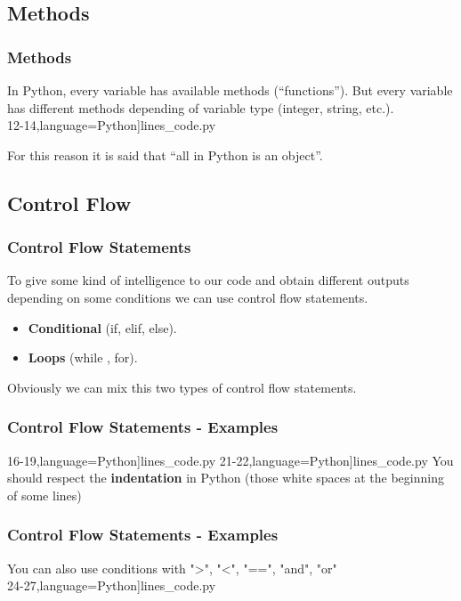 \subsection{Methods}
\begin{frame}
\frametitle{Methods}

{\normalsize In Python, every variable has available methods (“functions”). But every variable has different methods depending of variable type (integer, string, etc.). \\}
\vspace{1em}
{12-14},language=Python]{lines_code.py}

{\normalsize For this reason it is said that “all in Python is an object”.\\}

\end{frame}

\subsection{Control Flow}
\begin{frame}
\frametitle{Control Flow Statements}

{\normalsize To give some kind of intelligence to our code and obtain different outputs depending on some conditions we can use control flow statements.   
\\}
\vspace{1em}
\begin{itemize}
	\item \textbf{Conditional} (if, elif, else).
	\item \textbf{Loops} (while , for).
\end{itemize}
\vspace{1em}
{\normalsize Obviously we can mix this two types of control flow statements.}
\end{frame}

\begin{frame}
\frametitle{Control Flow Statements - Examples}
{16-19},language=Python]{lines_code.py}
\vspace{1em}
{21-22},language=Python]{lines_code.py}
\vspace{1em}
{\normalsize You should respect the \textbf{indentation} in Python (those white spaces at the beginning of some lines)}
\end{frame}

\begin{frame}
\frametitle{Control Flow Statements - Examples}
{\normalsize You can also use conditions with ">", "<", "==", "and", "or"\\}
\vspace{1em}
{24-27},language=Python]{lines_code.py}
\end{frame}

